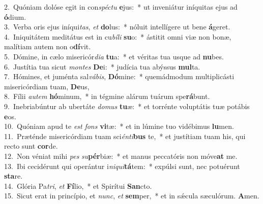 {2.~}Quóniam dolóse egit in con\textit{spé}\textit{ctu} \textbf{e}jus:~* ut inveniátur iníquitas ejus ad \textbf{ó}dium.\\
{3.~}Verba oris ejus iníqui\textit{tas}, \textit{et} \textbf{do}lus:~* nóluit intellígere ut bene \textbf{á}geret.\\
{4.~}Iniquitátem meditátus est in cu\textit{bí}\textit{li} \textbf{su}o:~* ástitit omni viæ non bonæ, malítiam autem non o\textbf{dí}vit.\\
{5.~}Dómine, in cælo misericór\textit{di}\textit{a} \textbf{tu}a:~* et véritas tua usque ad \textbf{nu}bes.\\
{6.~}Justítia tua sicut \textit{mon}\textit{tes} \textbf{De}i:~* judícia tua abýssus \textbf{mul}ta.\\
{7.~}Hómines, et juménta sal\textit{vá}\textit{bis}, \textbf{Dó}mine:~* quemádmodum multiplicásti misericórdiam tuam, \textbf{De}us,\\
{8.~}Fílii \textit{au}\textit{tem} \textbf{hó}minum,~* in tégmine alárum tuárum spe\textbf{rá}bunt.\\
{9.~}Inebriabúntur ab ubertáte \textit{do}\textit{mus} \textbf{tu}æ:~* et torrénte voluptátis tuæ potábis \textbf{e}os.\\
{10.~}Quóniam apud te \textit{est} \textit{fons} \textbf{vi}tæ:~* et in lúmine tuo vidébimus \textbf{lu}men.\\
{11.~}Præténde misericórdiam tuam sci\textit{én}\textit{ti}\textbf{bus} te,~* et justítiam tuam his, qui recto sunt \textbf{cor}de.\\
{12.~}Non véniat mihi \textit{pes} \textit{su}\textbf{pér}biæ:~* et manus peccatóris non móve\textbf{at} me.\\
{13.~}Ibi cecidérunt qui operántur i\textit{ni}\textit{qui}\textbf{tá}tem:~* expúlsi sunt, nec potuérunt \textbf{sta}re.\\
{14.~}Glória Pa\textit{tri}, \textit{et} \textbf{Fí}lio,~* et Spirítui \textbf{San}cto.\\
{15.~}Sicut erat in princípio, et \textit{nunc}, \textit{et} \textbf{sem}per,~* et in sǽcula sæculórum. \textbf{A}men.\\
